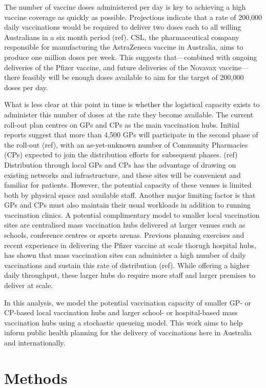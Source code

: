 \documentclass{article}
\begin{document}
The number of vaccine doses administered per day is key to achieving a
high vaccine coverage as quickly as possible. Projections indicate that
a rate of 200,000 daily vaccinations would be required to deliver two
doses each to all willing Australians in a six month period (ref). CSL,
the pharmaceutical company responsible for manufacturing the AstraZeneca
vaccine in Australia, aims to produce one million doses per week. This
suggests that---combined with ongoing deliveries of the Pfizer vaccine,
and future deliveries of the Novavax vaccine---there feasibly will be
enough doses available to aim for the target of 200,000 doses per day.

What is less clear at this point in time is whether the logistical
capacity exists to administer this number of doses at the rate they
become available. The current roll-out plan centres on GPs and CPs as
the main vaccination hubs. Initial reports suggest that more than 4,500
GPs will participate in the second phase of the roll-out (ref), with an
as-yet-unknown number of Community Pharmacies (CPs) expected to join the
distribution efforts for subsequent phases. (ref) Distribution through
local GPs and CPs has the advantage of drawing on existing networks and
infrastructure, and these sites will be convenient and familiar for
patients. However, the potential capacity of these venues is limited
both by physical space and available staff. Another major limiting
factor is that GPs and CPs must also maintain their usual workloads in
addition to running vaccination clinics. A potential complimentary model
to smaller local vaccination sites are centralised mass vaccination hubs
delivered at larger venues such as schools, conference centres or sports
arenas. Previous planning exercises and recent experience in delivering
the Pfizer vaccine at scale thorugh hospital hubs, has shown that mass
vaccination sites can administer a high number of daily vaccinations and
sustain this rate of distribution (ref). While offering a higher daily
throughput, these larger hubs do require more staff and larger premises
to deliver at scale.

In this analysis, we model the potential vaccination capacity of smaller
GP- or CP-based local vaccination hubs and larger school- or
hospital-based mass vaccination hubs using a stochastic queueing model.
This work aims to help inform public health planning for the delivery of
vaccinations here in Australia and internationally.

\hypertarget{methods}{%
\section{Methods}\label{methods}}
\end{document}
